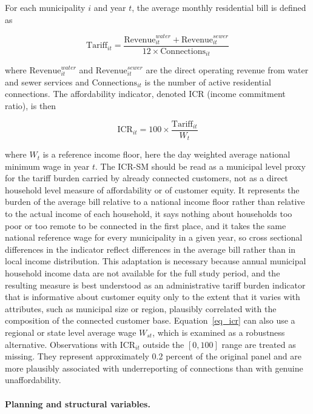 \documentclass[pdflatex,sn-mathphys-num]{sn-jnl}%
\theoremstyle{thmstyleone}%
\theoremstyle{thmstyletwo}%
\theoremstyle{thmstylethree}%
\begin{document}
For each municipality $i$ and year $t$, the average monthly residential bill is defined as

\begin{equation}
\text{Tariff}_{it} = \frac{\text{Revenue}^{water}_{it} + \text{Revenue}^{sewer}_{it}}{12 \times \text{Connections}_{it}}
\label{eq_tariff}
\end{equation}

where $\text{Revenue}^{water}_{it}$ and $\text{Revenue}^{sewer}_{it}$ are the direct operating revenue from water and sewer services and $\text{Connections}_{it}$ is the number of active residential connections. The affordability indicator, denoted ICR (income commitment ratio), is then

\begin{equation}
\text{ICR}_{it} = 100 \times \frac{\text{Tariff}_{it}}{W_{t}}
\label{eq_icr}
\end{equation}

where $W_{t}$ is a reference income floor, here the day weighted average national minimum wage in year $t$. The ICR-SM should be read as a municipal level proxy for the tariff burden carried by already connected customers, not as a direct household level measure of affordability or of customer equity. It represents the burden of the average bill relative to a national income floor rather than relative to the actual income of each household, it says nothing about households too poor or too remote to be connected in the first place, and it takes the same national reference wage for every municipality in a given year, so cross sectional differences in the indicator reflect differences in the average bill rather than in local income distribution. This adaptation is necessary because annual municipal household income data are not available for the full study period, and the resulting measure is best understood as an administrative tariff burden indicator that is informative about customer equity only to the extent that it varies with attributes, such as municipal size or region, plausibly correlated with the composition of the connected customer base. Equation~\eqref{eq_icr} can also use a regional or state level average wage $W_{st}$, which is examined as a robustness alternative. Observations with $\text{ICR}_{it}$ outside the $[0,100]$ range are treated as missing. They represent approximately 0.2 percent of the original panel and are more plausibly associated with underreporting of connections than with genuine unaffordability.

\paragraph{Planning and structural variables.}
\end{document}
